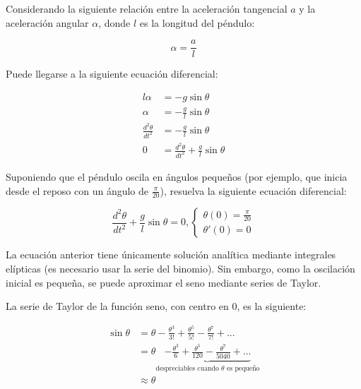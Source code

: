\begin{ex}
    Considerando la siguiente relación entre la aceleración tangencial $a$ y la aceleración angular $\alpha$, donde $l$ es la longitud del péndulo:

    \begin{equation*}
        \alpha = \frac{a}{l}
    \end{equation*}

    Puede llegarse a la siguiente ecuación diferencial:

    \begin{align*}
        l \alpha &= -g \sin \theta\\
        \alpha &= -\frac{g}{l} \sin \theta \\
        \frac{d^2 \theta}{dt^2} &= -\frac{g}{l} \sin \theta \\
        0 &= \frac{d^2 \theta}{dt^2} + \frac{g}{l} \sin \theta
    \end{align*}

    Suponiendo que el péndulo oscila en ángulos pequeños (por ejemplo, que
    inicia desde el reposo con un ángulo de $\frac{\pi}{20}$), resuelva la
    siguiente ecuación diferencial:

    \begin{equation*}{
            \frac{d^2 \theta}{dt^2} + \frac{g}{l} \sin \theta = 0,
            \begin{cases}
                \theta(0) = \frac{\pi}{20}\\
                \theta'(0) = 0
            \end{cases}
    }\end{equation*}

    \begin{solution}

        La ecuación anterior tiene únicamente solución analítica mediante
        integrales elípticas (es necesario usar la serie del binomio). Sin
        embargo, como la oscilación inicial es pequeña, se puede aproximar el
        seno mediante series de Taylor.

        La serie de Taylor de la función seno, con centro en 0, es la siguiente:

        \begin{align*}
            \sin \theta &= \theta - \frac{\theta^3}{3!} + \frac{\theta^5}{5!} - \frac{\theta^7}{7!} + ... \\  
                        &= \theta \underbrace{- \frac{\theta^3}{6} + \frac{\theta^5}{120} - \frac{\theta^7}{5040} + ...}_{\text{despreciables cuando } \theta \text{ es pequeño}} \\
                        &\approx \theta
        \end{align*}


\end{solution}
\end{ex}
